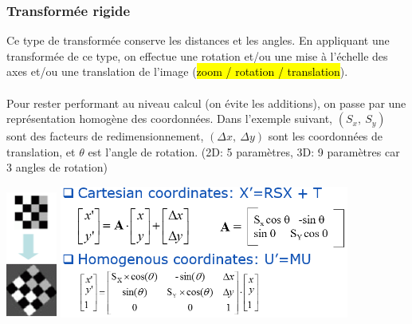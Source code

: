 \documentclass[letterpaper, 12pt]{article}
\newcommand{\alinea}{
\hspace*{0.5cm}}
\begin{document}
		\subsubsection{Transformée rigide}
			\alinea Ce type de transformée conserve les distances et les angles. En appliquant une transformée de ce type, on 
				effectue une rotation et/ou une mise à l'échelle des axes et/ou une translation de l'image 
				(\hl{zoom / rotation / translation}).\\
			~\\
			\alinea Pour rester performant au niveau calcul (on évite les additions), 
				on passe par une représentation homogène des coordonnées.
				Dans l'exemple suivant, $(S_x,\ S_y)$ sont des facteurs de redimensionnement, $(\Delta x,\ \Delta y)$ sont
				les coordonnées de translation, et $\theta$ est l'angle de rotation. 
				(2D: 5 paramètres, 3D: 9 paramètres car 3 angles de rotation)
			\begin{center}
				\includegraphics[width=0.66in]{Images/rigid} \hfill \includegraphics[width=3.75in]{Images/homogenous}
			\end{center}
\end{document}
